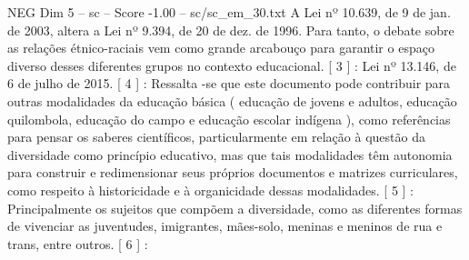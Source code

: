 \begin{textsample}{NEG Dim 5 – sc – Score -1.00 – sc/sc\_em\_30.txt}
A Lei nº 10.639, de 9 de jan. de 2003, altera a Lei nº 9.394, de 20 de dez. de 1996.
Para tanto, o debate sobre as relações étnico-raciais vem como grande arcabouço para garantir o espaço diverso desses diferentes grupos no contexto educacional. [ 3 ] : Lei nº 13.146, de 6 de julho de 2015. [ 4 ] : Ressalta -se que este documento pode contribuir para outras modalidades da educação básica ( educação de jovens e adultos, educação quilombola, educação do campo e educação escolar indígena ), como referências para pensar os saberes científicos, particularmente em relação à questão da diversidade como princípio educativo, mas que tais modalidades têm autonomia para construir e redimensionar seus próprios documentos e matrizes curriculares, como respeito à historicidade e à organicidade dessas modalidades. [ 5 ] : Principalmente os sujeitos que compõem a diversidade, como as diferentes formas de vivenciar as juventudes, imigrantes, mães-solo, meninas e meninos de rua e trans, entre outros. [ 6 ] :

\end{textsample}
